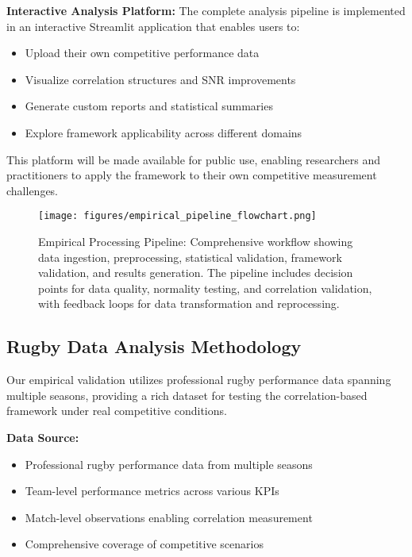 \textbf{Interactive Analysis Platform:}
The complete analysis pipeline is implemented in an interactive Streamlit application that enables users to:
\begin{itemize}
    \item Upload their own competitive performance data
    \item Visualize correlation structures and SNR improvements
    \item Generate custom reports and statistical summaries
    \item Explore framework applicability across different domains
\end{itemize}

This platform will be made available for public use, enabling researchers and practitioners to apply the framework to their own competitive measurement challenges.

\begin{figure}[h]
\centering
\texttt{[image: figures/empirical\_pipeline\_flowchart.png]}
\caption{Empirical Processing Pipeline: Comprehensive workflow showing data ingestion, preprocessing, statistical validation, framework validation, and results generation. The pipeline includes decision points for data quality, normality testing, and correlation validation, with feedback loops for data transformation and reprocessing.}
\label{fig:empirical_pipeline}
\end{figure}

\subsection{Rugby Data Analysis Methodology}

Our empirical validation utilizes professional rugby performance data spanning multiple seasons, providing a rich dataset for testing the correlation-based framework under real competitive conditions.

\textbf{Data Source:}
\begin{itemize}
    \item Professional rugby performance data from multiple seasons
    \item Team-level performance metrics across various KPIs
    \item Match-level observations enabling correlation measurement
    \item Comprehensive coverage of competitive scenarios
\end{itemize}

